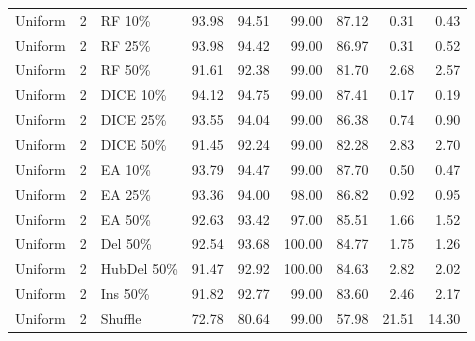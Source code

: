 {\begin{longtable}{rllrrrrrr}
Uniform & 2 & RF 10\% & 93.98 & 94.51 & 99.00 & 87.12 & 0.31 & 0.43 \\
Uniform & 2 & RF 25\% & 93.98 & 94.42 & 99.00 & 86.97 & 0.31 & 0.52 \\
Uniform & 2 & RF 50\% & 91.61 & 92.38 & 99.00 & 81.70 & 2.68 & 2.57 \\
Uniform & 2 & DICE 10\% & 94.12 & 94.75 & 99.00 & 87.41 & 0.17 & 0.19 \\
Uniform & 2 & DICE 25\% & 93.55 & 94.04 & 99.00 & 86.38 & 0.74 & 0.90 \\
Uniform & 2 & DICE 50\% & 91.45 & 92.24 & 99.00 & 82.28 & 2.83 & 2.70 \\
Uniform & 2 & EA 10\% & 93.79 & 94.47 & 99.00 & 87.70 & 0.50 & 0.47 \\
Uniform & 2 & EA 25\% & 93.36 & 94.00 & 98.00 & 86.82 & 0.92 & 0.95 \\
Uniform & 2 & EA 50\% & 92.63 & 93.42 & 97.00 & 85.51 & 1.66 & 1.52 \\
Uniform & 2 & Del 50\% & 92.54 & 93.68 & 100.00 & 84.77 & 1.75 & 1.26 \\
Uniform & 2 & HubDel 50\% & 91.47 & 92.92 & 100.00 & 84.63 & 2.82 & 2.02 \\
Uniform & 2 & Ins 50\% & 91.82 & 92.77 & 99.00 & 83.60 & 2.46 & 2.17 \\
Uniform & 2 & Shuffle & 72.78 & 80.64 & 99.00 & 57.98 & 21.51 & 14.30 \\
\end{longtable}
}

